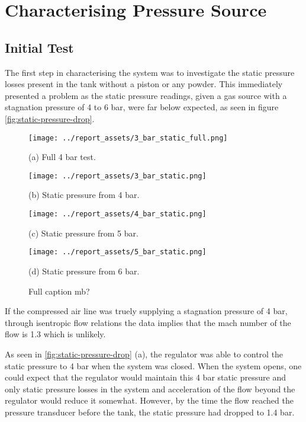 \section{Characterising Pressure Source}\label{sec:static_test}
\subsection{Initial Test}
The first step in characterising the system was to investigate the static pressure losses present in the tank without a piston or any powder. This immediately presented a problem as the static pressure readings, given a gas source with a stagnation pressure of 4 to 6 bar, were far below expected, as seen in figure \autoref{fig:static-pressure-drop}. 
\begin{figure}[htbp]
    \centering

    \begin{minipage}{0.45\textwidth}
        \centering
        \texttt{[image: ../report\_assets/3\_bar\_static\_full.png]}
        \caption*{(a) Full 4 bar test.}
    \end{minipage}
    \hfill
    \begin{minipage}{0.45\textwidth}
        \centering
        \texttt{[image: ../report\_assets/3\_bar\_static.png]}
        \caption*{(b) Static pressure from 4 bar.}
    \end{minipage}
    \begin{minipage}{0.45\textwidth}
        \centering
        \texttt{[image: ../report\_assets/4\_bar\_static.png]}
        \caption*{(c) Static pressure from 5 bar.}
    \end{minipage}
    \hfill
    \begin{minipage}{0.45\textwidth}
        \centering
        \texttt{[image: ../report\_assets/5\_bar\_static.png]}
        \caption*{(d) Static pressure from 6 bar.}
    \end{minipage}

    \caption{Full caption mb?}\label{fig:static-pressure-drop}
\end{figure}
If the compressed air line was truely supplying a stagnation pressure of 4 bar, through isentropic flow relations the data implies that the mach number of the flow is 1.3 which is unlikely.

As seen in \autoref{fig:static-pressure-drop} (a), the regulator was able to control the static pressure to 4 bar when the system was closed. When the system opens, one could expect that the regulator would maintain this 4 bar static pressure and only static pressure losses in the system and acceleration of the flow beyond the regulator would reduce it somewhat. However, by the time the flow reached the pressure transducer before the tank, the static pressure had dropped to 1.4 bar. 

